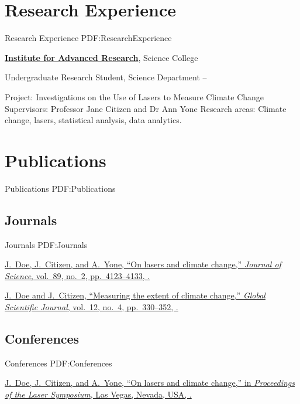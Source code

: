 \documentclass[a4paper,10pt,oneside]{article}
\begin{document}
\begin{body}

\section
{Research Experience}
{Research Experience}
{PDF:ResearchExperience}

\href{http://www.example.com/my-institute}
{\textbf{Institute for Advanced Research}},
Science College
\par
Undergraduate Research Student, Science Department
\hfill
{} --
\begin{detail}
\BulletItem
Project:
Investigations on the Use of Lasers to Measure Climate Change
\BulletItem
Supervisors:
Professor Jane Citizen and
Dr Ann Yone
\BulletItem
Research areas:
Climate change, lasers, statistical analysis, data analytics.
\end{detail}


\section
{Publications}
{Publications}
{PDF:Publications}

\subsection
{Journals}
{Journals}
{PDF:Journals}

\EntryGapNoBreak
\NumberedItem{[11]}
\href{http://www.example.com/my-paper-doi-4}
{\underline{J.~Doe}, J.~Citizen, and A.~Yone,
``On lasers and climate change,''
\textit{Journal of Science},
vol.~89,
no.~2,
pp.~4123--4133,
.}

\EntryGap
\NumberedItem{{\CharSpace}[1]}
\href{http://www.example.com/my-paper-doi-3}
{\underline{J.~Doe} and J.~Citizen,
``Measuring the extent of climate change,''
\textit{Global Scientific Journal},
vol.~12,
no.~4,
pp.~330--352,
.}

\BigEntryGap
\subsection
{Conferences}
{Conferences}
{PDF:Conferences}

\EntryGap
\NumberedItem{[11]}
\href{http://www.example.com/my-paper-doi-2}
{\underline{J.~Doe}, J.~Citizen, and A.~Yone,
``On lasers and climate change,''
in \textit{Proceedings of the Laser Symposium},
Las Vegas, Nevada, USA,
.}


\end{body}
\end{document}
